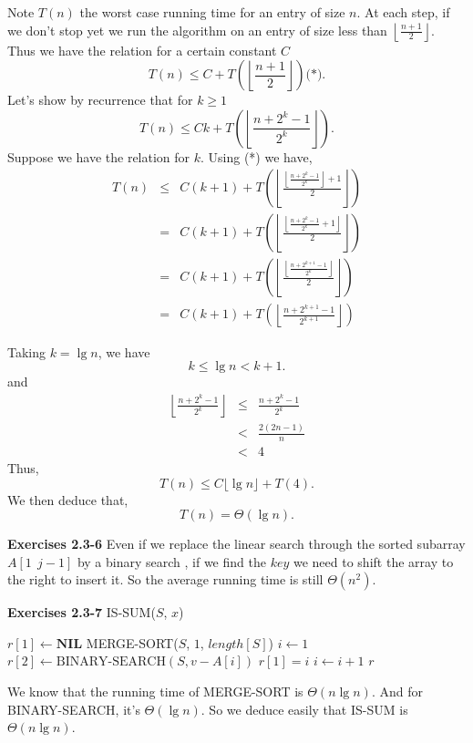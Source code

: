 \documentclass[a4paper,12pt]{article}
\newcommand{\newpar}[1]
{\bigskip \noindent \textbf{Exercises #1} \newline}
\newcommand{\la}{\leftarrow}
\begin{document}
Note $T(n)$ the worst case running time for an entry of size $n$.  At
each step, if we don't stop yet we run the algorithm on an entry of
size less than $\left\lfloor\frac{n+1}{2}\right\rfloor$.  Thus we have
the relation for a certain constant $C$
\[ T(n) \le C + 
T\left(\left\lfloor\frac{n+1}{2}\right\rfloor\right) \mbox{(*)}.\]
Let's show by recurrence that for $k \ge 1$
\[ T(n) \le C k + 
T\left(\left\lfloor\frac{n+2^k-1}{2^k}\right\rfloor\right).\]
Suppose we have the relation for $k$.  Using (*) we have,
\begin{eqnarray*}
T(n) &\le& C(k+1) + T\left(\left\lfloor\frac{
\left\lfloor\frac{n + 2^k - 1}{2^k}\right\rfloor + 1
}{2}\right\rfloor\right)\\ &=&
C(k+1) + T\left(\left\lfloor\frac{
\left\lfloor\frac{n + 2^k - 1}{2^k} + 1\right\rfloor
}{2}\right\rfloor\right)\\ &=&
C(k+1) + T\left(\left\lfloor\frac{
\left\lfloor\frac{n + 2^{k+1} - 1}{2^k}\right\rfloor
}{2}\right\rfloor\right)\\ &=&
C(k+1) + T\left(\left\lfloor
\frac{n + 2^{k+1} - 1}{2^{k+1}}\right\rfloor\right)
\end{eqnarray*}

\medskip
Taking $k = \lg n$, we have
\[ k \le \lg n < k+1.\]
and
\begin{eqnarray*}
\left\lfloor\frac{n + 2^k - 1}{2^k}\right\rfloor &\le&
\frac{n+2^k-1}{2^k}\\ &<&
\frac{2(2n-1)}{n}\\ &<&
4
\end{eqnarray*}
Thus,
\[ T(n) \le C \lfloor \lg n \rfloor + T(4).\]
We then deduce that,
\[ T(n) = \Theta(\lg n).\]

\newpar{2.3-6} Even if we replace the linear search through the sorted
subarray $A[1\ \ j-1]$ by a binary search , if we find the $key$ we
need to shift the array to the right to insert it.  So the average
running time is still $\Theta(n^2)$.

\newpar{2.3-7}
IS-SUM($S$, $x$)
\begin{algorithmic}
\STATE $r[1] \la \mathbf{NIL}$ 
\STATE MERGE-SORT($S$, $1$, $length[S]$)
\STATE $i \la 1$
	\STATE $r[2] \la \mbox{BINARY-SEARCH}(S, v - A[i]) $
		\STATE $r[1] = i$
	\ENDIF
	\STATE $i \la i+1$
\ENDWHILE
\RETURN $r$	
\end{algorithmic}

We know that the running time of MERGE-SORT is $\Theta(n\lg n)$.  And
for BINARY-SEARCH, it's $\Theta(\lg n)$.  So we deduce easily that
IS-SUM is $\Theta(n\lg n)$.
\end{document}
